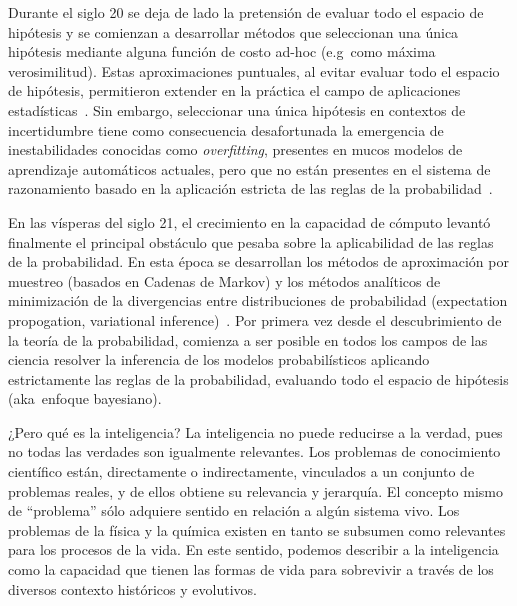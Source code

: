 \documentclass[10pt]{article}
\begin{document}

Durante el siglo 20 se deja de lado la pretensión de evaluar todo el espacio de hipótesis y se comienzan a desarrollar métodos que seleccionan una única hipótesis mediante alguna función de costo ad-hoc (e.g~como máxima verosimilitud).
Estas aproximaciones puntuales, al evitar evaluar todo el espacio de hipótesis, permitieron extender en la práctica el campo de aplicaciones estadísticas~\cite{friedman2001-elementsOfStatisticalLearning}.
Sin embargo, seleccionar una única hipótesis en contextos de incertidumbre tiene como consecuencia desafortunada la emergencia de inestabilidades conocidas como \emph{overfitting}, presentes en mucos modelos de aprendizaje automáticos actuales, pero que no están presentes en el sistema de razonamiento basado en la aplicación estricta de las reglas de la probabilidad~\cite{bishop2006-PRML}.


En las vísperas del siglo 21, el crecimiento en la capacidad de cómputo levantó finalmente el principal obstáculo que pesaba sobre la aplicabilidad de las reglas de la probabilidad.
En esta época se desarrollan los métodos de aproximación por muestreo (basados en Cadenas de Markov) y los métodos analíticos de minimización de la divergencias entre distribuciones de probabilidad (expectation propogation, variational inference)~\cite{bishop2006-PRML}.
Por primera vez desde el descubrimiento de la teoría de la probabilidad, comienza a ser posible en todos los campos de las ciencia resolver la inferencia de los modelos probabilísticos aplicando estrictamente las reglas de la probabilidad, evaluando todo el espacio de hipótesis (aka~enfoque bayesiano).


¿Pero qué es la inteligencia?
La inteligencia no puede reducirse a la verdad, pues no todas las verdades son igualmente relevantes.
Los problemas de conocimiento científico están, directamente o indirectamente, vinculados a un conjunto de problemas reales, y de ellos obtiene su relevancia y jerarquía.
El concepto mismo de ``problema'' sólo adquiere sentido en relación a algún sistema vivo.
Los problemas de la física y la química existen en tanto se subsumen como relevantes para los procesos de la vida.
En este sentido, podemos describir a la inteligencia como la capacidad que tienen las formas de vida para sobrevivir a través de los diversos contexto históricos y evolutivos.

\end{document}
